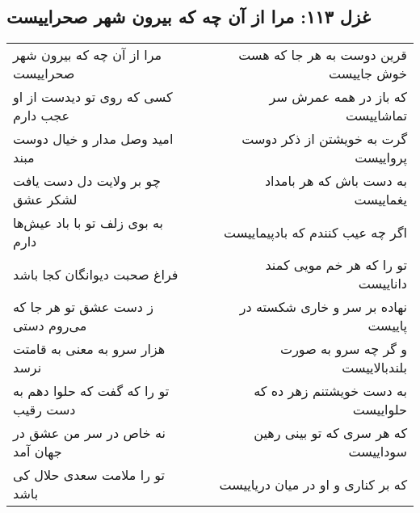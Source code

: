 \begin{center}
\section*{غزل ۱۱۳: مرا از آن چه که بیرون شهر صحراییست}
\label{sec:113}
\begin{longtable}{l p{0.5cm} r}
مرا از آن چه که بیرون شهر صحراییست
&&
قرین دوست به هر جا که هست خوش جاییست
\\
کسی که روی تو دیدست از او عجب دارم
&&
که باز در همه عمرش سر تماشاییست
\\
امید وصل مدار و خیال دوست مبند
&&
گرت به خویشتن از ذکر دوست پرواییست
\\
چو بر ولایت دل دست یافت لشکر عشق
&&
به دست باش که هر بامداد یغماییست
\\
به بوی زلف تو با باد عیش‌ها دارم
&&
اگر چه عیب کنندم که بادپیماییست
\\
فراغ صحبت دیوانگان کجا باشد
&&
تو را که هر خم مویی کمند داناییست
\\
ز دست عشق تو هر جا که می‌روم دستی
&&
نهاده بر سر و خاری شکسته در پاییست
\\
هزار سرو به معنی به قامتت نرسد
&&
و گر چه سرو به صورت بلندبالاییست
\\
تو را که گفت که حلوا دهم به دست رقیب
&&
به دست خویشتنم زهر ده که حلواییست
\\
نه خاص در سر من عشق در جهان آمد
&&
که هر سری که تو بینی رهین سوداییست
\\
تو را ملامت سعدی حلال کی باشد
&&
که بر کناری و او در میان دریاییست
\\
\end{longtable}
\end{center}
